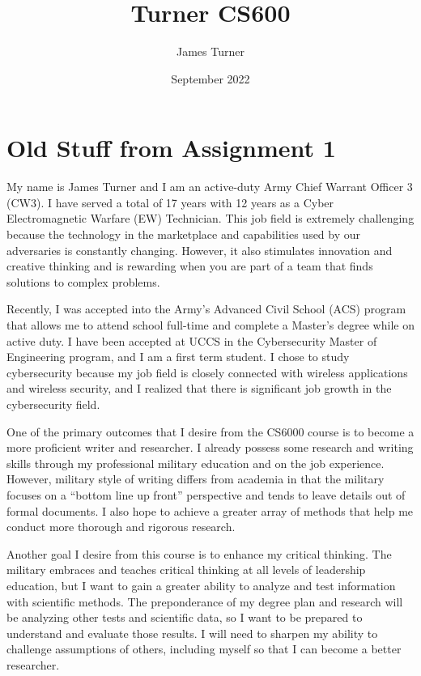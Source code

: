 \documentclass{article}
\title{Turner  CS600}
\author{James Turner}
\date{September 2022}
\begin{document}
\maketitle
\newpage
\section{Old Stuff from Assignment 1}
My name is James Turner and I am an active-duty Army Chief Warrant Officer 3 (CW3).  I have served a total of 17 years with 12 years as a Cyber Electromagnetic Warfare (EW) Technician.  This job field is extremely challenging because the technology in the marketplace and capabilities used by our adversaries is constantly changing.  However, it also stimulates innovation and creative thinking and is rewarding when you are part of a team that finds solutions to complex problems.

Recently, I was accepted into the Army’s Advanced Civil School (ACS) program that allows me to attend school full-time and complete a Master’s degree while on active duty.  I have been accepted at UCCS in the Cybersecurity Master of Engineering program, and I am a first term student.  I chose to study cybersecurity because my job field is closely connected with wireless applications and wireless security, and I realized that there is significant job growth in the cybersecurity field.

One of the primary outcomes that I desire from the CS6000 course is to become a more proficient writer and researcher.   I already possess some research and writing skills through my professional military education and on the job experience.  However, military style of writing differs from academia in that the military focuses on a “bottom line up front” perspective and tends to leave details out of formal documents.  I also hope to achieve a greater array of methods that help me conduct more thorough and rigorous research.

Another goal I desire from this course is to enhance my critical thinking.  The military embraces and teaches critical thinking at all levels of leadership education, but I want to gain a greater ability to analyze and test information with scientific methods.  The preponderance of my degree plan and research will be analyzing other tests and scientific data, so I want to be prepared to understand and evaluate those results.  I will need to sharpen my ability to challenge assumptions of others, including myself so that I can become a better researcher.
\end{document}
